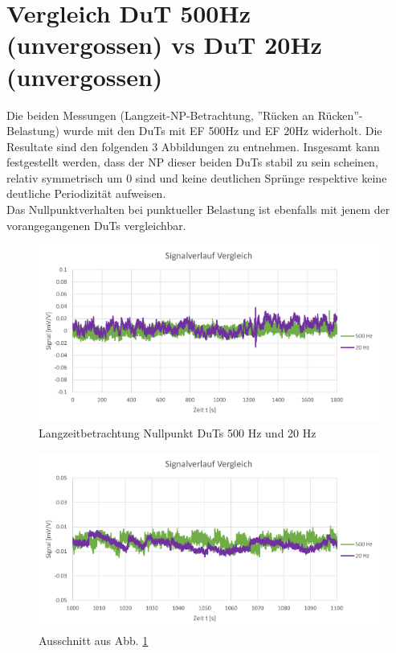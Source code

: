 \section{Vergleich DuT 500Hz (unvergossen) vs DuT 20Hz (unvergossen)}
Die beiden Messungen (Langzeit-NP-Betrachtung, ''Rücken an Rücken''-Belastung) wurde mit den DuTs mit EF 500Hz und EF 20Hz widerholt. Die Resultate  sind den folgenden 3 Abbildungen zu entnehmen. Insgesamt kann festgestellt werden, dass der NP dieser beiden DuTs stabil zu sein scheinen, relativ symmetrisch um 0 sind und keine deutlichen Sprünge respektive keine deutliche Periodizität aufweisen. \\
Das Nullpunktverhalten bei punktueller Belastung ist ebenfalls mit jenem der vorangegangenen DuTs vergleichbar.
\begin{figure}[H]
	\centering
	\includegraphics[width=1\linewidth]{imgs/daten_007_kpl}
	\caption{Langzeitbetrachtung Nullpunkt DuTs 500 Hz und 20 Hz}
	\label{fig:daten007kpl}
\end{figure}
\begin{figure}[H]
	\centering
	\includegraphics[width=1\linewidth]{imgs/daten_007_detail}
	\caption{Ausschnitt aus Abb. \ref{fig:daten007kpl}}
	\label{fig:daten007detail}
\end{figure}
